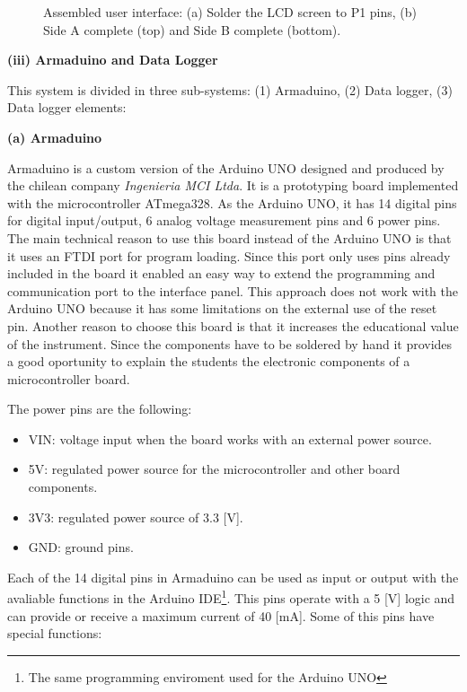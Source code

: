 \documentclass[12pt,letterpaper]{article}
\numberwithin{figure}{section}
\numberwithin{equation}{section}
\numberwithin{table}{section}
\begin{document}
\begin{figure}[H]
\begin{minipage}{0.5\textwidth}
    \end{minipage}
    \caption{Assembled user interface: (a) Solder the LCD screen to P1 pins, (b) Side A complete (top) and Side B complete (bottom).}
    \label{fig:9}
\end{figure}

\begin{flushleft}
\textbf{(iii) Armaduino and Data Logger}
\end{flushleft}

This system is divided in three sub-systems: (1) Armaduino, (2) Data logger, (3) Data logger elements:

\begin{flushleft}
\textbf{(a) Armaduino}
\end{flushleft}

Armaduino is a custom version of the Arduino UNO designed and produced by the chilean company \textit{Ingenieria MCI Ltda}. It is a  prototyping board implemented with the microcontroller ATmega328. As the Arduino UNO, it has 14 digital pins for digital input/output, 6 analog voltage measurement pins and 6 power pins. The main technical reason to use this board instead of the Arduino UNO is that it uses an FTDI port for program loading. Since this port only uses pins already included in the board it enabled an easy way to extend the programming and communication port to the interface panel. This approach does not work with the Arduino UNO because it has some limitations on the external use of the reset pin. Another reason to choose this board is that it increases the educational value of the instrument. Since the components have to be soldered by hand it provides a good oportunity to explain the students the electronic components of a microcontroller board.

The power pins are the following:

\begin{itemize}
    \item VIN: voltage input when the board works with an external power source.
    \item 5V: regulated power source for the microcontroller and other board components.
    \item 3V3: regulated power source of 3.3 [V].
    \item GND: ground pins.
\end{itemize}

Each of the 14 digital pins in Armaduino can be used as input or output with the avaliable functions in the Arduino IDE\footnote{The same programming enviroment used for the Arduino UNO}. This pins operate with a 5 [V] logic and can provide or receive a maximum current of 40 [mA]. Some of this pins have special functions:
\end{document}

